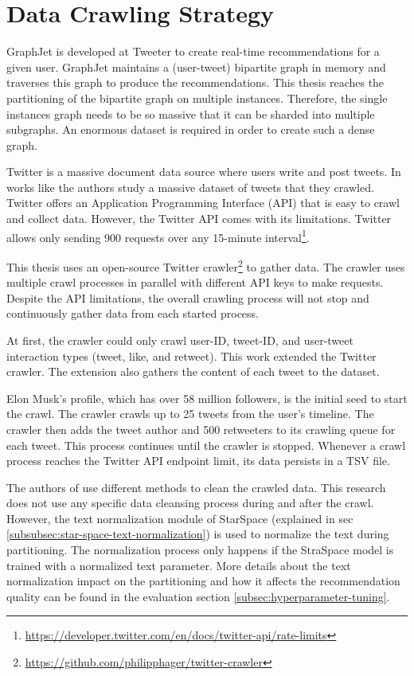 \section{Data Crawling Strategy}
\label{sec:data-crawling-strategy}

GraphJet is developed at Tweeter to create real-time recommendations for a given user. GraphJet maintains a (user-tweet) bipartite graph in memory and traverses this graph to produce the recommendations. This thesis reaches the partitioning of the bipartite graph on multiple instances. Therefore, the single instances graph needs to be so massive that it can be sharded into multiple subgraphs. An enormous dataset is required in order to create such a dense graph.


Twitter is a massive document data source where users write and post tweets. In works like \cite{kwakWhatTwitterSocial2010} the authors study a massive dataset of tweets that they crawled. Twitter offers an Application Programming Interface (API) that is easy to crawl and collect data. However, the Twitter API comes with its limitations. Twitter allows only sending 900 requests over any 15-minute interval\footnote{\url{https://developer.twitter.com/en/docs/twitter-api/rate-limits}}. 


This thesis uses an open-source Twitter crawler\footnote{\url{https://github.com/philipphager/twitter-crawler}} to gather data. The crawler uses multiple crawl processes in parallel with different API keys to make requests. Despite the API limitations, the overall crawling process will not stop and continuously gather data from each started process.


At first, the crawler could only crawl user-ID, tweet-ID, and user-tweet interaction types (tweet, like, and retweet). This work extended the Twitter crawler. The extension also gathers the content of each tweet to the dataset. 


Elon Musk's profile, which has over 58 million followers, is the initial seed to start the crawl. The crawler crawls up to 25 tweets from the user's timeline. The crawler then adds the tweet author and 500 retweeters to its crawling queue for each tweet. This process continues until the crawler is stopped. Whenever a crawl process reaches the Twitter API endpoint limit, its data persists in a TSV file.


The authors of \cite{kwakWhatTwitterSocial2010} use different methods to clean the crawled data. This research does not use any specific data cleansing process during and after the crawl. However, the text normalization module of StarSpace (explained in sec \ref{subsubsec:star-space-text-normalization}) is used to normalize the text during partitioning. The normalization process only happens if the StraSpace model is trained with a normalized text parameter. More details about the text normalization impact on the partitioning and how it affects the recommendation quality can be found in the evaluation section \ref{subsec:hyperparameter-tuning}.


